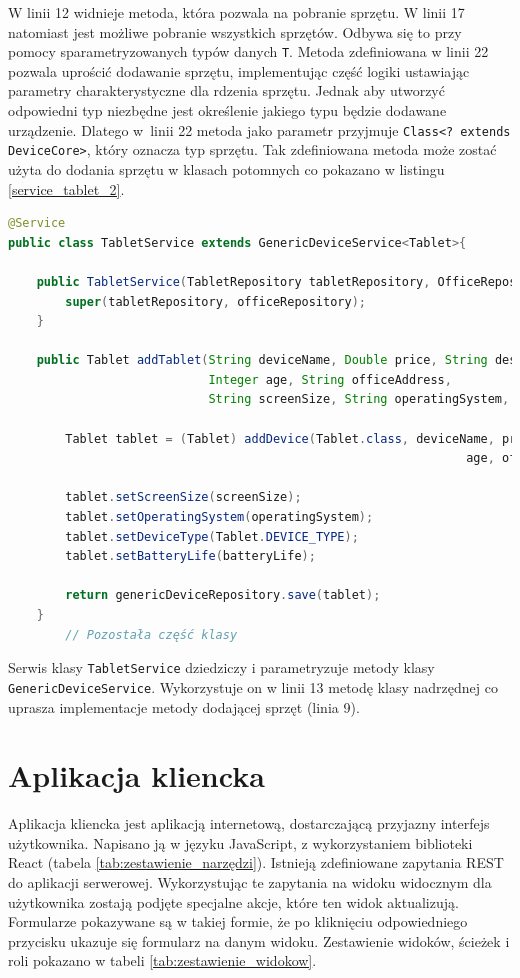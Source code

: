 W linii 12 widnieje metoda, która pozwala na pobranie sprzętu. W linii 17 natomiast jest możliwe pobranie wszystkich sprzętów. Odbywa się to przy pomocy sparametryzowanych typów danych \texttt{T}. Metoda zdefiniowana w linii 22 pozwala uprościć dodawanie sprzętu, implementując część logiki ustawiając parametry charakterystyczne dla rdzenia sprzętu. Jednak aby utworzyć odpowiedni typ niezbędne jest określenie jakiego typu będzie dodawane urządzenie. Dlatego w~linii 22 metoda jako parametr przyjmuje \texttt{Class<? extends DeviceCore>}, który oznacza typ sprzętu. Tak zdefiniowana metoda może zostać użyta do dodania sprzętu w klasach potomnych co pokazano w listingu \ref{service_tablet_2}.

\begin{lstlisting}[language=Java, style=JavaStyle,  caption={Klasa potomna serwisu tabletu: TabletService }, label={service_tablet_2}]
@Service
public class TabletService extends GenericDeviceService<Tablet>{

    public TabletService(TabletRepository tabletRepository, OfficeRepository officeRepository){
        super(tabletRepository, officeRepository);
    }

    public Tablet addTablet(String deviceName, Double price, String description,
                            Integer age, String officeAddress,
                            String screenSize, String operatingSystem, String batteryLife){

        Tablet tablet = (Tablet) addDevice(Tablet.class, deviceName, price, description,
                                                                age, officeAddress);

        tablet.setScreenSize(screenSize);
        tablet.setOperatingSystem(operatingSystem);
        tablet.setDeviceType(Tablet.DEVICE_TYPE);
        tablet.setBatteryLife(batteryLife);

        return genericDeviceRepository.save(tablet);
    }
		// Pozostała część klasy
\end{lstlisting}

Serwis klasy \texttt{TabletService} dziedziczy i parametryzuje metody klasy \texttt{GenericDeviceService}. Wykorzystuje on w linii 13 metodę klasy nadrzędnej co uprasza implementacje metody dodającej sprzęt (linia 9).

\section {Aplikacja kliencka}
Aplikacja kliencka jest aplikacją internetową, dostarczającą przyjazny interfejs użytkownika. Napisano ją w języku JavaScript, z wykorzystaniem biblioteki React (tabela \ref{tab:zestawienie_narzędzi}). Istnieją zdefiniowane zapytania REST do aplikacji serwerowej. Wykorzystując te zapytania na widoku widocznym dla użytkownika zostają podjęte specjalne akcje, które ten widok aktualizują. Formularze pokazywane są w takiej formie, że po kliknięciu odpowiedniego przycisku ukazuje się formularz na danym widoku. Zestawienie widoków, ścieżek i roli pokazano w tabeli \ref{tab:zestawienie_widokow}.

